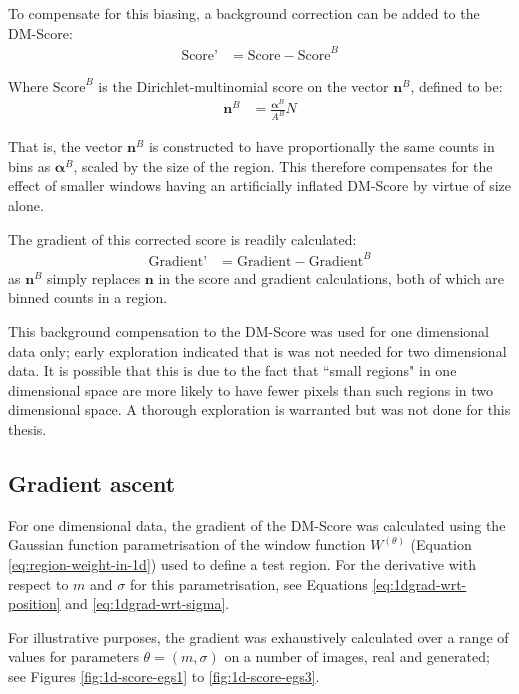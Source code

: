 To compensate for this biasing, a background correction can be added to the DM-Score:
\begin{align}
\text{Score'}
&= \text{Score} - \text{Score}^{B} 
\label{eq:corrected-score}
\end{align}

Where $\text{Score}^B$ is the Dirichlet-multinomial score on the vector $\mathbf{n}^B$, defined to be:
\begin{align}
\mathbf{n}^B
&=\frac{\boldsymbol{\alpha}^B}{A^B} N
\end{align}

That is, the vector $\mathbf{n}^B$ is constructed to have proportionally the same counts in bins as $\boldsymbol{\alpha}^B$, scaled by the size of the region. This therefore compensates for the effect of smaller windows having an artificially inflated DM-Score by virtue of size alone.

The gradient of this corrected score is readily calculated:
\begin{align}
\text{Gradient'}
&= \text{Gradient} - \text{Gradient}^{B} 
\end{align}
as $\mathbf{n}^B$ simply replaces $\mathbf{n}$ in the score and gradient calculations, both of which are binned counts in a region.

This background compensation to the DM-Score was used for one dimensional data only; early exploration indicated that is was not needed for two dimensional data. It is possible that this is due to the fact that ``small regions" in one dimensional space are more likely to have fewer pixels than such regions in two dimensional space. A thorough exploration is warranted but was not done for this thesis.


\subsection{Gradient ascent}\label{sec:grad-asc-1d}
For one dimensional data, the gradient of the DM-Score was calculated using the Gaussian function parametrisation of the window function $W^{(\theta)}$ (Equation \ref{eq:region-weight-in-1d}) used to define a test region. For the derivative with respect to $m$ and $\sigma$ for this parametrisation, see Equations \ref{eq:1dgrad-wrt-position} and \ref{eq:1dgrad-wrt-sigma}.

For illustrative purposes, the gradient was exhaustively calculated over a range of values for parameters $\theta = (m,\sigma)$ on a number of images, real and generated; see Figures \ref{fig:1d-score-egs1} to \ref{fig:1d-score-egs3}.

